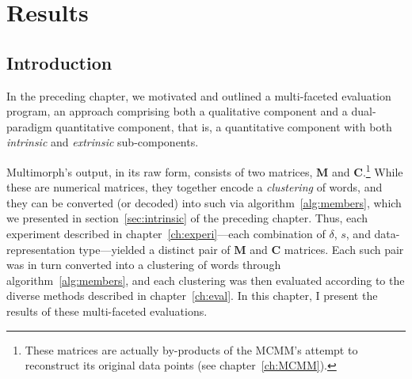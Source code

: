 \chapter{Results}
\label{ch:results}

\section{Introduction}

In the preceding chapter, %
we motivated and outlined a multi-faceted evaluation program, an approach comprising both
a qualitative component and a dual-paradigm quantitative component, that is, a quantitative component with 
both \emph{intrinsic} and \emph{extrinsic} sub-components. 


Multimorph's output, in its raw form,
consists of two matrices, $\mathbf{M}$ and $\mathbf{C}$.\footnote{These 
matrices are actually by-products of the MCMM's attempt to reconstruct its original 
data points (see chapter~\ref{ch:MCMM}).} While these are numerical matrices,
they together encode a \emph{clustering} of words, and they can be converted (or decoded) 
into such via algorithm~\ref{alg:members}, which we presented in section~\ref{sec:intrinsic} 
of the preceding chapter. 
Thus, each experiment described in
chapter~\ref{ch:experi}---each combination of $\delta$, $s$, and 
data-representation type---yielded a distinct pair of $\mathbf{M}$ and $\mathbf{C}$ 
matrices. Each such pair was in turn converted into a clustering of words through 
algorithm~\ref{alg:members}, and each clustering was then evaluated according to the diverse 
methods described in chapter~\ref{ch:eval}. 
In this chapter, I present the results of these multi-faceted evaluations. 


